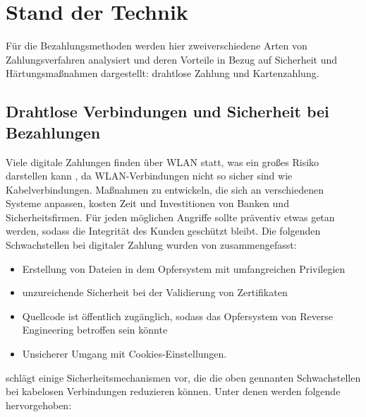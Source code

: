 \section{Stand der Technik}

Für die Bezahlungsmethoden werden hier zweiverschiedene Arten von Zahlungsverfahren analysiert und deren
Vorteile in Bezug auf Sicherheit und Härtungsmaßnahmen dargestellt: drahtlose Zahlung und Kartenzahlung.

\subsection{Drahtlose Verbindungen und Sicherheit bei Bezahlungen}

Viele digitale Zahlungen finden über WLAN statt, was ein großes Risiko darstellen kann \cite{refip:NYRS}, 
da WLAN-Verbindungen nicht so sicher sind wie Kabelverbindungen. Maßnahmen zu entwickeln, die sich an 
verschiedenen Systeme anpassen, kosten Zeit und Investitionen von Banken und Sicherheitsfirmen. 
Für jeden möglichen Angriffe sollte präventiv etwas getan werden, sodass die Integrität des Kunden 
geschützt bleibt. Die folgenden Schwachstellen bei digitaler Zahlung wurden von \cite{refip:NYRS}
zusammengefasst:

\begin{itemize}
    \item Erstellung von Dateien in dem Opfersystem mit umfangreichen Privilegien
    \item unzureichende Sicherheit bei der Validierung von Zertifikaten
    \item Quellcode ist öffentlich zugänglich, sodass das Opfersystem von Reverse
    Engineering betroffen sein könnte
    \item Unsicherer Umgang mit Cookies-Einstellungen.
\end{itemize}

\cite{refip:NYRS} schlägt einige Sicherheitsmechanismen vor, die die oben gennanten Schwachstellen bei 
kabelosen Verbindungen reduzieren können. Unter denen werden folgende hervorgehoben: 


